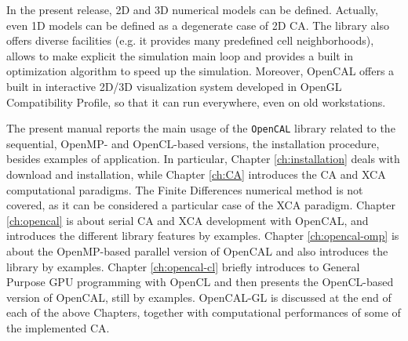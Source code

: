 In the present release, 2D and 3D numerical models can be
defined. Actually, even 1D models can be defined as a degenerate case
of 2D CA. The library also offers diverse facilities (e.g. it provides
many predefined cell neighborhoods), allows to make explicit the
simulation main loop and provides a built in optimization algorithm to
speed up the simulation. Moreover, OpenCAL offers a built in
interactive 2D/3D visualization system developed in OpenGL
Compatibility Profile, so that it can run everywhere, even on old
workstations.

The present manual reports the main usage of the \verb'OpenCAL'
library related to the sequential, OpenMP- and OpenCL-based versions,
the installation procedure, besides examples of application. In
particular, Chapter \ref{ch:installation} deals with download and
installation, while Chapter \ref{ch:CA} introduces the CA and XCA
computational paradigms. The Finite Differences numerical method is
not covered, as it can be considered a particular case of the XCA
paradigm. Chapter \ref{ch:opencal} is about serial CA and XCA
development with OpenCAL, and introduces the different library features
by examples. Chapter \ref{ch:opencal-omp} is about the OpenMP-based
parallel version of OpenCAL and also introduces the library by
examples. Chapter \ref{ch:opencal-cl} briefly introduces to General
Purpose GPU programming with OpenCL and then presents the OpenCL-based
version of OpenCAL, still by examples. OpenCAL-GL is discussed at the
end of each of the above Chapters, together with computational
performances of some of the implemented CA.

